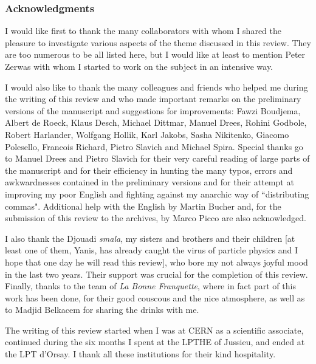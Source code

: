 \subsubsection*{Acknowledgments}

I would like first to thank the many collaborators with whom I shared the
pleasure to investigate various aspects of the theme discussed in this review. 
They are too numerous to be all listed here, but I would like at least to
mention Peter Zerwas with whom I started to work on the subject in an intensive
way.\s

I would also like to thank the many colleagues and friends who helped me during
the writing of this review and who made important remarks on the preliminary
versions of the manuscript and suggestions for improvements: Fawzi Boudjema,
Albert de Roeck, Klaus Desch, Michael Dittmar, Manuel Drees, Rohini Godbole,
Robert Harlander, Wolfgang Hollik, Karl Jakobs, Sasha Nikitenko, Giacomo
Polesello, Francois Richard, Pietro Slavich and Michael Spira.  Special thanks
go to Manuel Drees and Pietro Slavich for their very careful reading of large
parts of the manuscript and for their efficiency in hunting the many typos,
errors and awkwardnesses contained in the preliminary versions and for their
attempt at improving my poor English and fighting against my anarchic way of
``distributing commas". Additional help with the English by Martin Bucher and,
for the submission of this review to the archives, by Marco Picco are also
acknowledged. \s

I also thank the Djouadi {\it smala}, my sisters and brothers and their
children [at least one of them, Yanis, has already caught the virus of particle
physics and I hope that one day he will read this review], who bore my not
always joyful mood in the last two years. Their support was crucial for the
completion of this review. Finally, thanks to the team of {\it La Bonne
Franquette}, where in fact part of this work has been done, for their good
couscous and the nice atmosphere, as well as to Madjid Belkacem for sharing the
drinks with me.\s 

The writing of this review  started when I was at CERN as a scientific
associate, continued during the six months I spent at the LPTHE of Jussieu, 
and ended at the LPT d'Orsay. I thank all these institutions for their kind
hospitality. 

\newpage

